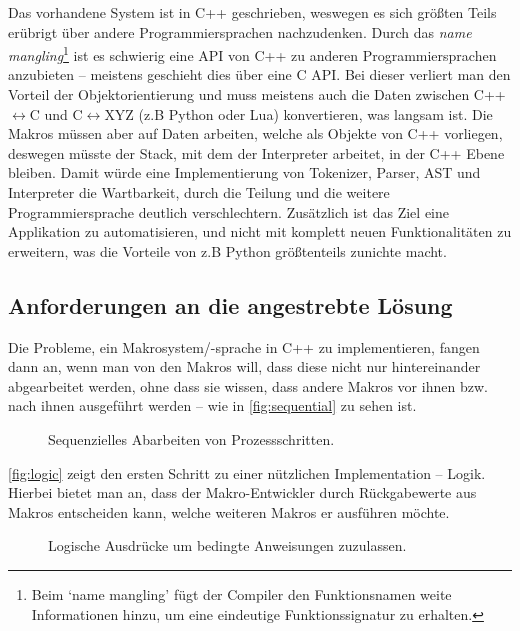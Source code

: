     Das vorhandene System ist in C++ geschrieben, weswegen es sich größten Teils erübrigt über andere Programmiersprachen nachzudenken. Durch das \emph{name mangling}\footnote{
      Beim `name mangling' fügt der Compiler den Funktionsnamen weite Informationen hinzu, um eine eindeutige Funktionssignatur zu erhalten.
    } ist es schwierig eine API von C++ zu anderen Programmiersprachen anzubieten -- meistens geschieht dies über eine C API. Bei dieser verliert man den Vorteil der Objektorientierung und muss meistens auch die Daten zwischen C++$\longleftrightarrow$C und C$\longleftrightarrow$XYZ (z.B Python oder Lua) konvertieren, was langsam ist. Die Makros müssen aber auf Daten arbeiten, welche als Objekte von C++ vorliegen, deswegen müsste der Stack, mit dem der Interpreter arbeitet, in der C++ Ebene bleiben. Damit würde eine Implementierung von Tokenizer, Parser, AST und Interpreter die Wartbarkeit, durch die Teilung und die weitere Programmiersprache deutlich verschlechtern. Zusätzlich ist das Ziel eine Applikation zu automatisieren, und nicht mit komplett neuen Funktionalitäten zu erweitern, was die Vorteile von z.B Python größtenteils zunichte macht.

  \subsection{Anforderungen an die angestrebte Lösung}
  \label{ssec:Anforderungen an die angestrebte Lösung}
    Die Probleme, ein Makrosystem/-sprache in C++ zu implementieren, fangen dann an, wenn man von den Makros will, dass diese nicht nur hintereinander abgearbeitet werden, ohne dass sie wissen, dass andere Makros vor ihnen bzw. nach ihnen ausgeführt werden -- wie in \autoref{fig:sequential} zu sehen ist.

    \begin{figure}[H]
      \centering
      
      \caption{Sequenzielles Abarbeiten von Prozessschritten.}
      \label{fig:sequential}
    \end{figure}

    \autoref{fig:logic} zeigt den ersten Schritt zu einer nützlichen Implementation -- Logik. Hierbei bietet man an, dass der Makro-Entwickler durch Rückgabewerte aus Makros entscheiden kann, welche weiteren Makros er ausführen möchte.

    \begin{figure}[H]
      \centering
      
      \caption{Logische Ausdrücke um bedingte Anweisungen zuzulassen.}
      \label{fig:logic}
    \end{figure}

